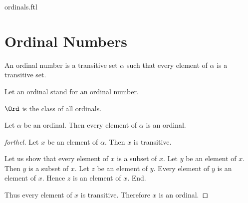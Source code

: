 \documentclass{naproche-library}
\begin{document}
\begin{smodule}{ordinals.ftl}


  \section*{Ordinal Numbers}

  \begin{definition}[forthel,id=SET_THEORY_02_229593678086144]
    An ordinal number is a transitive set $\alpha$ such that every element of $\alpha$ is a transitive set.

    Let an ordinal stand for an ordinal number.
  \end{definition}

  \begin{definition}[forthel,id=SET_THEORY_02_5852994258075648]
    $\Ord$ is the class of all ordinals.
  \end{definition}

  \begin{proposition}[forthel,id=SET_THEORY_02_2358097091756032]
    Let $\alpha$ be an ordinal.
    Then every element of $\alpha$ is an ordinal.
  \end{proposition}
  \begin{proof}[forthel]
    Let $x$ be an element of $\alpha$.
    Then $x$ is transitive.

    Let us show that every element of $x$ is a subset of $x$.
      Let $y$ be an element of $x$.
      Then $y$ is a subset of $x$.
      Let $z$ be an element of $y$.
      Every element of $y$ is an element of $x$.
      Hence $z$ is an element of $x$.
    End.

    Thus every element of $x$ is transitive.
    Therefore $x$ is an ordinal.
  \end{proof}
\end{smodule}
\end{document}
